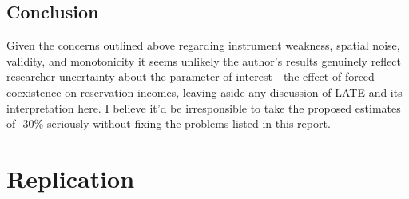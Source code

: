 \documentclass[12pt]{article}
\begin{document}
\subsection{Conclusion}
Given the concerns outlined above regarding instrument weakness, spatial noise, validity, and monotonicity it seems unlikely the author's results genuinely reflect researcher uncertainty 
about the parameter of interest - the effect of forced coexistence on  reservation incomes, leaving aside any discussion of LATE and its interpretation here. I believe it'd be irresponsible to take the proposed estimates of 
-$30\%$ seriously without fixing the problems listed in this report.
\section{Replication} 



    
\end{document}
